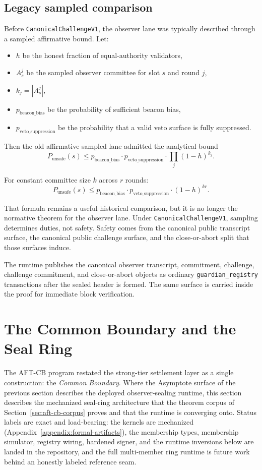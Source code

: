 \documentclass[11pt]{article}
\newcommand{\code}[1]{\texttt{#1}}
\newcommand{\term}[1]{\textit{#1}}
\begin{document}
\subsection{Legacy sampled comparison}

Before \code{CanonicalChallengeV1}, the observer lane was typically described
through a sampled affirmative bound. Let:

\begin{itemize}[leftmargin=1.5em]
\item \(h\) be the honest fraction of equal-authority validators,
\item \(A_s^j\) be the sampled observer committee for slot \(s\) and round
\(j\),
\item \(k_j = |A_s^j|\),
\item \(p_{\mathrm{beacon\_bias}}\) be the probability of sufficient beacon
bias,
\item \(p_{\mathrm{veto\_suppression}}\) be the probability that a valid veto
surface is fully suppressed.
\end{itemize}

Then the old affirmative sampled lane admitted the analytical bound
\[
P_{\mathrm{unsafe}}(s)
\le
p_{\mathrm{beacon\_bias}}
\cdot
p_{\mathrm{veto\_suppression}}
\cdot
\prod_j (1 - h)^{k_j}.
\]

For constant committee size \(k\) across \(r\) rounds:
\[
P_{\mathrm{unsafe}}(s)
\le
p_{\mathrm{beacon\_bias}}
\cdot
p_{\mathrm{veto\_suppression}}
\cdot
(1 - h)^{kr}.
\]

That formula remains a useful historical comparison, but it is no longer the
normative theorem for the observer lane. Under \code{CanonicalChallengeV1},
sampling determines duties, not safety. Safety comes from the canonical public
transcript surface, the canonical public challenge surface, and the
close-or-abort split that those surfaces induce.

The runtime publishes the canonical observer transcript, commitment, challenge,
challenge commitment, and close-or-abort objects as ordinary
\code{guardian\_registry} transactions after the sealed header is formed. The
same surface is carried inside the proof for immediate block verification.

\section{The Common Boundary and the Seal Ring}
\label{sec:common-boundary}

The AFT-CB program restated the strong-tier settlement layer as a single
construction: the \term{Common Boundary}. Where the Asymptote surface of
the previous section describes the deployed observer-sealing runtime, this
section describes the mechanized seal-ring architecture that the theorem
corpus of Section~\ref{sec:aft-cb-corpus} proves and that the runtime is
converging onto. Status labels are exact and load-bearing: the kernels are
mechanized (Appendix~\ref{appendix:formal-artifacts}), the membership
types, membership simulator, registry wiring, hardened signer, and the
runtime inversions below are landed in the repository, and the full
multi-member ring runtime is future work behind an honestly labeled
reference seam.
\end{document}
